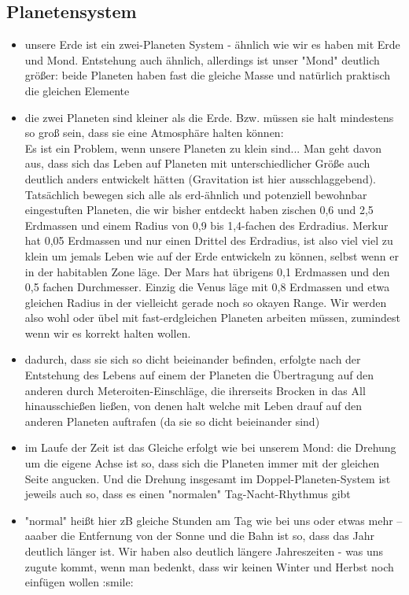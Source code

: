 \subsection{Planetensystem}
\begin{itemize}
	\item unsere Erde ist ein zwei-Planeten System - ähnlich wie wir es haben mit Erde und Mond. Entstehung auch ähnlich, allerdings ist unser "Mond" deutlich größer: beide Planeten haben fast die gleiche Masse und natürlich praktisch die gleichen Elemente
	\item die zwei Planeten sind kleiner als die Erde. Bzw. müssen sie halt mindestens so groß sein, dass sie eine Atmosphäre halten können: \\
	Es ist ein Problem, wenn unsere Planeten zu klein sind... Man geht davon aus, dass sich das Leben auf Planeten mit unterschiedlicher Größe auch deutlich anders entwickelt hätten (Gravitation ist hier ausschlaggebend). Tatsächlich bewegen sich alle als erd-ähnlich und potenziell bewohnbar eingestuften Planeten, die wir bisher entdeckt haben zischen 0,6 und 2,5 Erdmassen und einem Radius von 0,9 bis 1,4-fachen des Erdradius. Merkur hat 0,05 Erdmassen und nur einen Drittel des Erdradius, ist also viel viel zu klein um jemals Leben wie auf der Erde entwickeln zu können, selbst wenn er in der habitablen Zone läge. Der Mars hat übrigens 0,1 Erdmassen und den 0,5 fachen Durchmesser. Einzig die Venus läge mit 0,8 Erdmassen und etwa gleichen Radius in der vielleicht gerade noch so okayen Range. Wir werden also wohl oder übel mit fast-erdgleichen Planeten arbeiten müssen, zumindest wenn wir es korrekt halten wollen.
	\item dadurch, dass sie sich so dicht beieinander befinden, erfolgte nach der Entstehung des Lebens auf einem der Planeten die Übertragung auf den anderen durch Meteroiten-Einschläge, die ihrerseits Brocken in das All hinausschießen ließen, von denen halt welche mit Leben drauf auf den anderen Planeten auftrafen (da sie so dicht beieinander sind)
	\item im Laufe der Zeit ist das Gleiche erfolgt wie bei unserem Mond: die Drehung um die eigene Achse ist so, dass sich die Planeten immer mit der gleichen Seite angucken. Und die Drehung insgesamt im Doppel-Planeten-System ist jeweils auch so, dass es einen "normalen" Tag-Nacht-Rhythmus gibt
	\item "normal" heißt hier zB gleiche Stunden am Tag wie bei uns oder etwas mehr -- aaaber die Entfernung von der Sonne und die Bahn ist so, dass das Jahr deutlich länger ist. Wir haben also deutlich längere Jahreszeiten - was uns zugute kommt, wenn man bedenkt, dass wir keinen Winter und Herbst noch einfügen wollen :smile:
\end{itemize}

